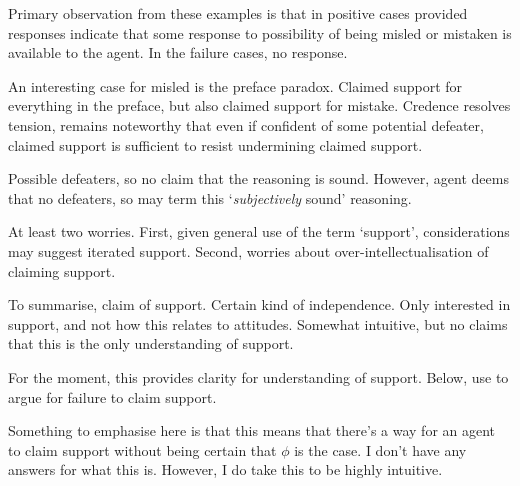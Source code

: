 \begin{note}
  Primary observation from these examples is that in positive cases provided responses indicate that some response to possibility of being misled or mistaken is available to the agent.
  In the failure cases, no response.


  An interesting case for misled is the preface paradox.
  Claimed support for everything in the preface, but also claimed support for mistake.
  Credence resolves tension, remains noteworthy that even if confident of some potential defeater, claimed support is sufficient to resist undermining claimed support.

\end{note}

\begin{note}[???]
  \color{red}
  Possible defeaters, so no claim that the reasoning is sound.
  However, agent deems that no defeaters, so may term this `\emph{subjectively} sound' reasoning.

  At least two worries.
  First, given general use of the term `support', considerations may suggest iterated support.
  Second, worries about over-intellectualisation of claiming support.
\end{note}


\begin{note}
  To summarise, claim of support.
  Certain kind of independence.
  Only interested in support, and not how this relates to attitudes.
  Somewhat intuitive, but no claims that this is the only understanding of support.

  For the moment, this provides clarity for understanding of support.
  Below, use to argue for failure to claim support.
\end{note}

\begin{note}
  \color{red}
  Something to emphasise here is that this means that there's a way for an agent to claim support without being certain that \(\phi\) is the case.
  I don't have any answers for what this is.
  However, I do take this to be highly intuitive.
\end{note}

